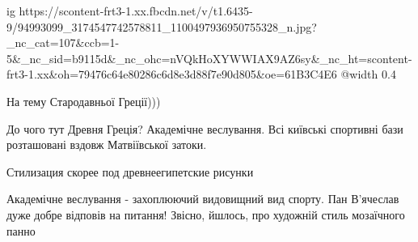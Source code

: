  
 
 
 
 

\ifcmt
  ig https://scontent-frt3-1.xx.fbcdn.net/v/t1.6435-9/94993099_3174547742578811_1100497936950755328_n.jpg?_nc_cat=107&ccb=1-5&_nc_sid=b9115d&_nc_ohc=nVQkHoXYWWIAX9AZ6sy&_nc_ht=scontent-frt3-1.xx&oh=79476c64e80286c6d8e3d88f7e90d805&oe=61B3C4E6
  @width 0.4
\fi

На тему Стародавньої Греції)))

До чого тут Древня Греція? Академічне веслування. Всі київські спортивні бази розташовані вздовж Матвіївської затоки.

Стилизация скорее под древнеегипетские рисунки


Академічне веслування - захоплюючий видовищний вид спорту. Пан В'ячеслав дуже
добре відповів на питання! Звісно, йшлось, про художній стиль мозаїчного панно
